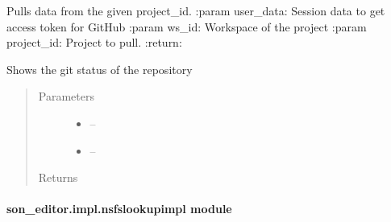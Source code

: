 \documentclass[letterpaper,10pt,english]{sphinxmanual}
\begin{document}

\begin{fulllineitems}
\label{_source/son_editor.impl:son_editor.impl.gitimpl.pull}
Pulls data from the given project\_id.
:param user\_data: Session data to get access token for GitHub
:param ws\_id: Workspace of the project
:param project\_id: Project to pull.
:return:

\end{fulllineitems}


\begin{fulllineitems}
\label{_source/son_editor.impl:son_editor.impl.gitimpl.setup_git_user_email}
\end{fulllineitems}


\begin{fulllineitems}
\label{_source/son_editor.impl:son_editor.impl.gitimpl.status}
Shows the git status of the repository
\begin{quote}\begin{description}
\item[{Parameters}] \leavevmode\begin{itemize}
\item {} 
 -- 

\item {} 
 -- 

\end{itemize}

\item[{Returns}] \leavevmode


\end{description}\end{quote}

\end{fulllineitems}



\paragraph{son\_editor.impl.nsfslookupimpl module}
\label{_source/son_editor.impl:son-editor-impl-nsfslookupimpl-module}\label{_source/son_editor.impl:module-son_editor.impl.nsfslookupimpl}
\end{document}
